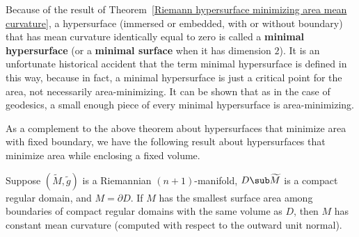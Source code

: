 Because of the result of Theorem~\ref{Riemann hypersurface minimizing area mean curvature}, a hypersurface (immersed or embedded, with or without boundary) that has 
mean curvature identically equal to zero is called a \textbf{minimal hypersurface} (or a \textbf{minimal surface} when it has dimension $2$). It is an unfortunate 
historical accident that the term minimal hypersurface is defined in this way, because in fact, a minimal hypersurface is just a critical point for the area, not 
necessarily area-minimizing. It can be shown that as in the case of geodesics, a small enough piece of every minimal hypersurface is area-minimizing.\par
As a complement to the above theorem about hypersurfaces that minimize area with fixed boundary, we have the following result about hypersurfaces that minimize area 
while enclosing a fixed volume.
\begin{theorem}
Suppose $(\widetilde{M},\tilde{g})$ is a Riemannian $(n+1)$-manifold, $D\sub\widetilde{M}$ is a compact regular domain, and $M=\partial D$. If $M$ has the smallest 
surface area among boundaries of compact regular domains with the same volume as $D$, then $M$ has constant mean curvature (computed with respect to the outward unit 
normal).
\end{theorem}
